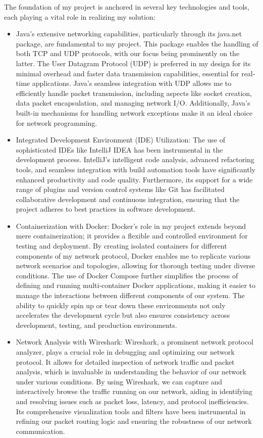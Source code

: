 \documentclass{article}
\begin{document}
The foundation of my project is anchored in several key technologies and tools, each playing a vital role in realizing my solution:
\begin{itemize}

	\item Java's extensive networking capabilities, particularly through its java.net package, are fundamental to my project. This package enables the handling of both TCP and UDP protocols, with our focus being prominently on the latter. The User Datagram Protocol (UDP) is preferred in my design for its minimal overhead and faster data transmission capabilities, essential for real-time applications. Java's seamless integration with UDP allows me to efficiently handle packet transmission, including aspects like socket creation, data packet encapsulation, and managing network I/O. Additionally, Java’s built-in mechanisms for handling network exceptions make it an ideal choice for network programming.


	\item Integrated Development Environment (IDE) Utilization: The use of sophisticated IDEs like IntelliJ IDEA has been instrumental in the development process. IntelliJ's intelligent code analysis, advanced refactoring tools, and seamless integration with build automation tools have significantly enhanced productivity and code quality. Furthermore, its support for a wide range of plugins and version control systems like Git has facilitated collaborative development and continuous integration, ensuring that the project adheres to best practices in software development.


	\item Containerization with Docker: Docker's role in my project extends beyond mere containerization; it provides a flexible and controlled environment for testing and deployment. By creating isolated containers for different components of my network protocol, Docker enables me to replicate various network scenarios and topologies, allowing for thorough testing under diverse conditions. The use of Docker Compose further simplifies the process of defining and running multi-container Docker applications, making it easier to manage the interactions between different components of our system. The ability to quickly spin up or tear down these environments not only accelerates the development cycle but also ensures consistency across development, testing, and production environments.


	\item Network Analysis with Wireshark: Wireshark, a prominent network protocol analyzer, plays a crucial role in debugging and optimizing our network protocol. It allows for detailed inspection of network traffic and packet analysis, which is invaluable in understanding the behavior of our network under various conditions. By using Wireshark, we can capture and interactively browse the traffic running on our network, aiding in identifying and resolving issues such as packet loss, latency, and protocol inefficiencies. Its comprehensive visualization tools and filters have been instrumental in refining our packet routing logic and ensuring the robustness of our network communication.
\end{itemize}
\end{document}
